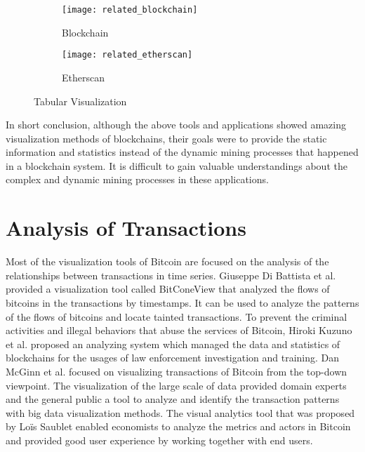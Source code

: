 \begin{figure}[htb]
    \centering
    \begin{subfigure}[b]{0.4\textwidth}
        \centering
        \texttt{[image: related\_blockchain]}
        \caption{Blockchain}
    \end{subfigure}
    \hfill
    \begin{subfigure}[b]{0.4\textwidth}
        \centering
        \texttt{[image: related\_etherscan]}
        \caption{Etherscan}
    \end{subfigure}

    \caption{Tabular Visualization}
    \label{fig:tabular visualization}
\end{figure}

In short conclusion, although the above tools and applications showed amazing visualization methods of blockchains, their goals were to provide the static information and statistics instead of the dynamic mining processes that happened in a blockchain system. It is difficult to gain valuable understandings about the complex and dynamic mining processes in these applications.

\section{Analysis of Transactions}

Most of the visualization tools of Bitcoin are focused on the analysis of the relationships between transactions in time series. Giuseppe Di Battista et al. \cite{Battista2015} provided a visualization tool called BitConeView that analyzed the flows of bitcoins in the transactions by timestamps. It can be used to analyze the patterns of the flows of bitcoins and locate tainted transactions. To prevent the criminal activities and illegal behaviors that abuse the services of Bitcoin, Hiroki Kuzuno et al. \cite{Kuzuno2017} proposed an analyzing system which managed the data and statistics of blockchains for the usages of law enforcement investigation and training. Dan McGinn et al. \cite{McGinn2016} focused on visualizing transactions of Bitcoin from the top-down viewpoint. The visualization of the large scale of data provided domain experts and the general public a tool to analyze and identify the transaction patterns with big data visualization methods. The visual analytics tool that was proposed by Loïs Saublet \cite{Saublet2015} enabled economists to analyze the metrics and actors in Bitcoin and provided good user experience by working together with end users.

